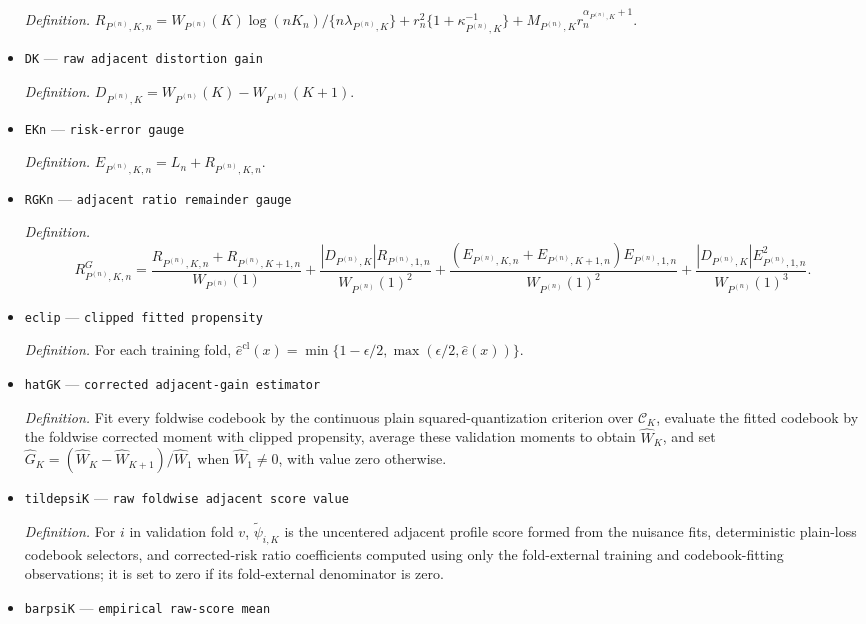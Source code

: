 \documentclass{article}
\begin{document}
\begin{itemize}
  \par\smallskip\noindent\emph{Definition.} \(R_{P^{(n)},K,n}=W_{P^{(n)}}(K)\log(nK_n)/\{n\lambda_{P^{(n)},K}\}+r_n^2\{1+\kappa_{P^{(n)},K}^{-1}\}+M_{P^{(n)},K}r_n^{\alpha_{P^{(n)},K}+1}\).
  \item \texttt{DK} --- \texttt{raw adjacent distortion gain}
  \par\smallskip\noindent\emph{Definition.} \(D_{P^{(n)},K}=W_{P^{(n)}}(K)-W_{P^{(n)}}(K+1)\).
  \item \texttt{EKn} --- \texttt{risk-\allowbreak{}error gauge}
  \par\smallskip\noindent\emph{Definition.} \(E_{P^{(n)},K,n}=L_n+R_{P^{(n)},K,n}\).
  \item \texttt{RGKn} --- \texttt{adjacent ratio remainder gauge}
  \par\smallskip\noindent\emph{Definition.} \[R^G_{P^{(n)},K,n}=\frac{R_{P^{(n)},K,n}+R_{P^{(n)},K+1,n}}{W_{P^{(n)}}(1)}+\frac{|D_{P^{(n)},K}|R_{P^{(n)},1,n}}{W_{P^{(n)}}(1)^2}+\frac{(E_{P^{(n)},K,n}+E_{P^{(n)},K+1,n})E_{P^{(n)},1,n}}{W_{P^{(n)}}(1)^2}+\frac{|D_{P^{(n)},K}|E_{P^{(n)},1,n}^2}{W_{P^{(n)}}(1)^3}.\]
  \item \texttt{eclip} --- \texttt{clipped fitted propensity}
  \par\smallskip\noindent\emph{Definition.} For each training fold, \(\widehat e^{\mathrm{cl}}(x)=\min\{1-\epsilon/2,\max(\epsilon/2,\widehat e(x))\}\).
  \item \texttt{hatGK} --- \texttt{corrected adjacent-\allowbreak{}gain estimator}
  \par\smallskip\noindent\emph{Definition.} Fit every foldwise codebook by the continuous plain squared-quantization criterion over \(\mathcal C_K\), evaluate the fitted codebook by the foldwise corrected moment with clipped propensity, average these validation moments to obtain \(\widehat W_K\), and set \(\widehat G_K=(\widehat W_K-\widehat W_{K+1})/\widehat W_1\) when \(\widehat W_1\neq0\), with value zero otherwise.
  \item \texttt{tildepsiK} --- \texttt{raw foldwise adjacent score value}
  \par\smallskip\noindent\emph{Definition.} For \(i\) in validation fold \(v\), \(\widetilde\psi_{i,K}\) is the uncentered adjacent profile score formed from the nuisance fits, deterministic plain-loss codebook selectors, and corrected-risk ratio coefficients computed using only the fold-external training and codebook-fitting observations; it is set to zero if its fold-external denominator is zero.
  \item \texttt{barpsiK} --- \texttt{empirical raw-\allowbreak{}score mean}

\end{itemize}
\end{document}
